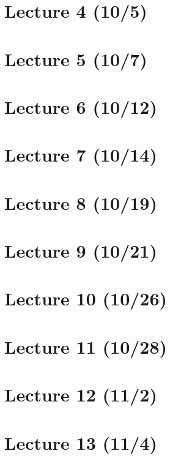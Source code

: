 \section{Lecture 4 (10/5)}

\newpage

\section{Lecture 5 (10/7)}

\newpage

\section{Lecture 6 (10/12)}

\newpage

\section{Lecture 7 (10/14)}

\newpage

\section{Lecture 8 (10/19)}

\newpage

\section{Lecture 9 (10/21)}

\newpage

\section{Lecture 10 (10/26)}

\newpage

\section{Lecture 11 (10/28)}

\newpage

\section{Lecture 12 (11/2)}

\newpage

\section{Lecture 13 (11/4)}

\newpage

